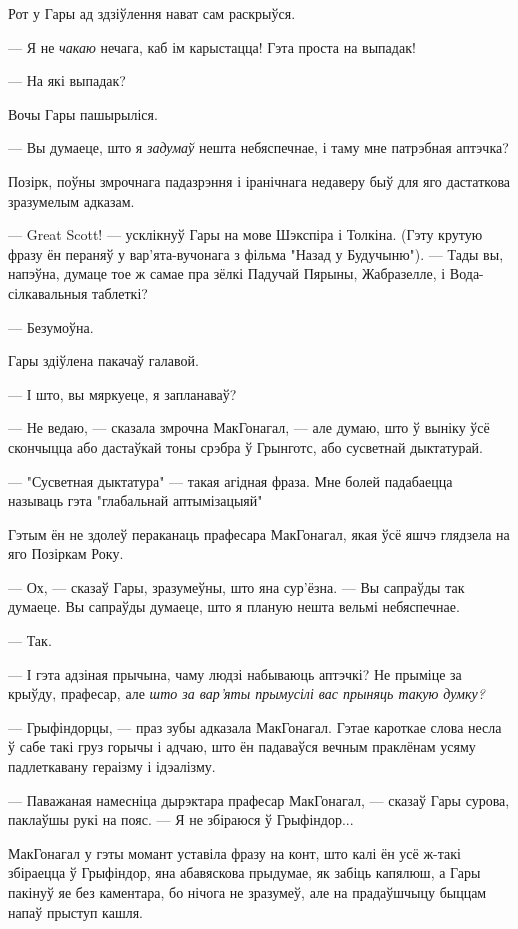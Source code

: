 Рот у Гары ад здзіўлення нават сам раскрыўся.

--- Я не \emph{чакаю} нечага, каб ім карыстацца! Гэта проста на выпадак!

--- На які выпадак? 

Вочы Гары пашырыліся.

--- Вы думаеце, што я \emph{задумаў} нешта небяспечнае, і таму мне патрэбная
аптэчка?

Позірк, поўны змрочнага падазрэння і іранічнага недаверу быў для яго дастаткова 
зразумелым адказам.

--- Great Scott! --- усклікнуў Гары на мове Шэкспіра і Толкіна. (Гэту крутую фразу
ён пераняў у вар'ята-вучонага з фільма "Назад у Будучыню"). --- Тады вы,
напэўна, думаце тое ж самае пра зёлкі Падучай Пярыны, Жабразелле, і Вода-сілкавальныя
таблеткі? 

--- Безумоўна.

Гары здіўлена пакачаў галавой.

--- І што, вы мяркуеце, я запланаваў?

--- Не ведаю, --- сказала змрочна МакГонагал, --- але думаю, што ў выніку ўсё скончыцца
або дастаўкай тоны срэбра ў Грынготс, або сусветнай дыктатурай.

--- "Сусветная дыктатура" --- такая агідная фраза. Мне болей падабаецца 
называць гэта "глабальнай аптымізацыяй"

Гэтым ён не здолеў пераканаць прафесара МакГонагал, якая ўсё яшчэ глядзела на 
яго Позіркам Року.

--- Ох, --- сказаў Гары, зразумеўны, што яна сур'ёзна. --- Вы сапраўды так думаеце. 
Вы сапраўды думаеце, што я планую нешта вельмі небяспечнае.

--- Так.

--- І гэта адзіная прычына, чаму людзі набываюць аптэчкі? Не прыміце за крыўду, 
прафесар, але \emph{што за вар'яты прымусілі вас прыняць такую думку?}

--- Грыфіндорцы, --- праз зубы адказала МакГонагал. Гэтае кароткае слова несла ў 
сабе такі груз горычы і адчаю, што ён падаваўся вечным праклёнам усяму падлеткавану 
гераізму і ідэалізму.

--- Паважаная намесніца дырэктара прафесар МакГонагал, --- сказаў Гары сурова, 
паклаўшы рукі на пояс. --- Я не збіраюся ў Грыфіндор...

МакГонагал у гэты момант уставіла фразу на конт, што калі ён усё ж-такі збіраецца
ў Грыфіндор, яна абавяскова прыдумае, як забіць капялюш, а Гары пакінуў яе без
каментара, бо нічога не зразумеў, але на прадаўшчыцу быццам напаў прыступ кашля.

